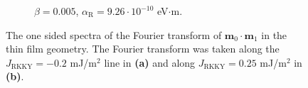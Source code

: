 \begin{figure}[h!]
\begin{subfigure}{.49\textwidth}
  \caption{$\beta = 0.005$, $\alpha_\text{R} = 9.26\cdot10^{-10}$ eV$\cdot$m.}
  \label{fig:FFTFilmXi05R25}
\end{subfigure}

\caption{The one sided spectra of the Fourier transform of $\mathbold{m}_0\cdot\mathbold{m}_1$ in the thin film geometry. The Fourier transform was taken along the $J_{\text{RKKY}}=-0.2$ mJ/m$^2$ line in \textbf{(a)} and along $J_{\text{RKKY}}=0.25$ mJ/m$^2$ in \textbf{(b)}.}
\label{fig:STOFilmFreq}
\end{figure}